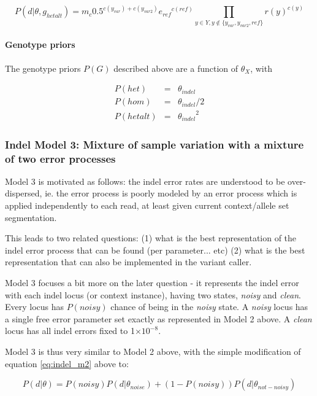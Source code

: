 \documentclass{article}
\newcommand{\e}[1]{\ensuremath{\times 10^{#1}}}
\begin{document}
\begin{equation*}
P (d \vert \theta, g_{hetalt}) = m_c 0.5^{c(y_{var})+c(y_{var2})} {e_{ref}}^{c(ref)} \prod_{y \in Y, y \not\in \{y_{var},y_{var2},ref\}} r(y)^{c(y)}
\end{equation*}


\paragraph{Genotype priors}

The genotype priors $P(G)$ described above are a function of $\theta_X$, with

\begin{eqnarray*}
P(het) &=& \theta_{indel} \\
P(hom) &=& \theta_{indel} / 2 \\
P(hetalt) &=& {\theta_{indel}}^2
\end{eqnarray*}


\subsubsection{Indel Model 3: Mixture of sample variation with a mixture of two error processes}

Model 3 is motivated as follows: the indel error rates are understood to be over-dispersed, ie. the error process is poorly modeled by an error process which is applied independently to each read, at least given current context/allele set segmentation.

This leads to two related questions: (1) what is the best representation of the indel error process that can be found (per parameter... etc) (2) what is the best representation that can also be implemented in the variant caller.

Model 3 focuses a bit more on the later question - it represents the indel error with each indel locus (or context instance), having two states, \emph{noisy} and \emph{clean}. Every locus has $P(noisy)$ chance of being in the \emph{noisy} state. A \emph{noisy} locus has a single free error parameter set exactly as represented in Model 2 above. A \emph{clean} locus has all indel errors fixed to 1\e{-8}.

Model 3 is thus very similar to Model 2 above, with the simple modification of equation \ref{eq:indel_m2} above to:

\begin{equation}
P(d \vert \theta) = P(noisy) P (d \vert \theta_{noise}) + (1-P(noisy)) P (d \vert \theta_{not-noisy})
\end{equation}
\end{document}
